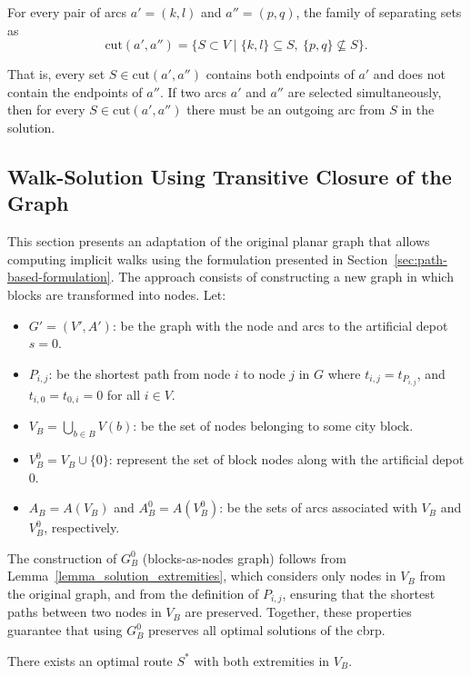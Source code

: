 For every pair of arcs $a' = (k, l)$ and $a'' = (p, q)$, the family
of separating sets as
\[
	\mathrm{cut}(a', a'') = \{ S \subset V \mid \{k, l\} \subseteq S, \ \{p, q\} \nsubseteq S \}.
\]

That is, every set $S \in \mathrm{cut}(a', a'')$ contains both endpoints of $a'$
and does not contain the endpoints of $a''$. If two arcs $a'$ and $a''$ are
selected simultaneously, then for every $S \in \mathrm{cut}(a', a'')$ there must
be an outgoing arc from $S$ in the solution.

\subsection{Walk-Solution Using Transitive Closure of the Graph}\label{sec:walk-solution-using-transitive-closure}

This section presents an adaptation of the original planar graph that allows
computing implicit walks using the formulation presented in
Section~\ref{sec:path-based-formulation}. The approach consists of constructing
a new graph in which blocks are transformed into nodes.
Let:

\begin{itemize}
	\item $G' = (V', A')$: be the graph with the node and arcs to the artificial
	      depot $s = 0$.
	\item $P_{i,j}$: be the shortest path from node $i$ to node $j$ in $G$ where
	      $t_{i,j} = t_{P_{i,j}}$, and $t_{i,0} = t_{0,i} = 0$ for all $i \in
		      V$.
	\item $V_B = \bigcup_{b \in B} V(b)$: be the set of nodes belonging to some
	      city block.
	\item $V_B^0 = V_B \cup \{0\}$: represent the set of block nodes along with
	      the artificial depot $0$.
	\item $A_B = A(V_B)$ and $A_B^0 = A(V_B^0)$: be the sets of arcs associated
	      with $V_B$ and $V_B^0$, respectively.
\end{itemize}

The construction of $G_B^0$ (blocks-as-nodes graph) follows from
Lemma~\ref{lemma_solution_extremities}, which considers only nodes in $V_B$ from
the original graph, and from the definition of $P_{i,j}$, ensuring that the
shortest paths between two nodes in $V_B$ are preserved. Together, these
properties guarantee that using $G_B^0$ preserves all optimal solutions of the
\gls{cbrp}.

\begin{property}
	\label{lemma_solution_extremities}
	There exists an optimal route $S^{*}$ with both extremities in $V_B$.
\end{property}


